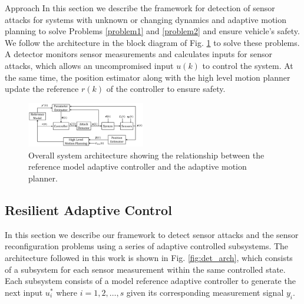 
\begin{section}{Approach}
\label{sec:approach}
In this section we describe the framework for detection of sensor attacks for systems with unknown or changing dynamics and adaptive motion planning to solve Problems \ref{problem1} and \ref{problem2} and ensure vehicle's safety. We follow the architecture in the block diagram of Fig. \ref{fig:system_arch} to solve these problems. A detector monitors sensor measurements and calculates inputs for sensor attacks, which allows an uncompromised input $u(k)$ to control the system. At the same time, the position estimator  along with the high level motion planner update the reference $r(k)$ of the controller to ensure safety.

\begin{figure}[ht!]
\vspace{1pt}
\centering
\includegraphics[width=0.46\textwidth]{sys_arch.png}
\caption{Overall system architecture showing the relationship between the reference model adaptive controller and the adaptive motion planner.}
\label{fig:system_arch}
\end{figure}

\subsection{Resilient Adaptive Control}
\label{sec:Res_adapt_control}

In this section  we describe our framework to detect sensor attacks and the sensor reconfiguration problems using a series of adaptive controlled subsystems. 
The architecture followed in this work is shown in Fig. \ref{fig:det_arch}, which consists of a subsystem for each sensor measurement within the same controlled state. Each subsystem consists of a model reference adaptive controller to generate the next input $u^*_i$ where $i=1,2,\dots,s$ given its corresponding measurement signal $y_i$.


\end{section}
